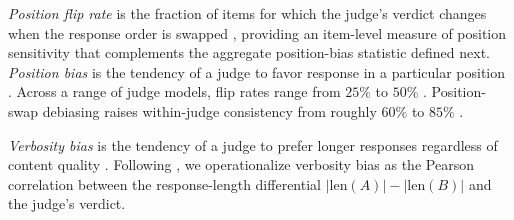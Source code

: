 \documentclass[11pt]{article}
\begin{document}
\textit{Position flip rate} is the fraction of items for which the judge's verdict changes when the response order is swapped \citep{zheng2023judging}, providing an item-level measure of position sensitivity that complements the aggregate position-bias statistic defined next.
\textit{Position bias} is the tendency of a judge to favor response in a particular position \citep{zheng2023judging, wang2023large, shi2024judging}. %
Across a range of judge models, flip rates range from $25\%$ to $50\%$ \citep{wang2023large, shi2024judging}. Position-swap debiasing raises within-judge consistency from roughly $60\%$ to $85\%$ \citep{li2024split}. 


\textit{Verbosity bias} is the tendency of a judge to prefer longer responses regardless of content quality \citep{wu2023style, dubois2024alpacaeval}. Following \citet{dubois2024alpacaeval}, we operationalize verbosity bias as the Pearson correlation between the response-length differential $|\text{len}(A)| - |\text{len}(B)|$ and the judge's verdict. %
\end{document}

